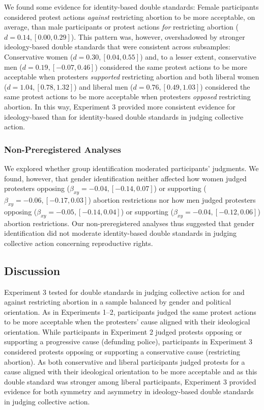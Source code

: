 \documentclass[twocolumn, 11pt, letterpaper]{article}
\begin{document}
We found some evidence for identity-based double standards: Female
participants considered protest actions \emph{against} restricting
abortion to be more acceptable, on average, than male participants or
protest actions \emph{for} restricting abortion
(\(d = 0.14, [0.00, 0.29]\)). This pattern was, however, overshadowed by
stronger ideology-based double standards that were consistent across
subsamples: Conservative women (\(d = 0.30, [0.04, 0.55]\)) and, to a
lesser extent, conservative men (\(d = 0.19, [-0.07, 0.46]\)) considered
the same protest actions to be more acceptable when protesters
\emph{supported} restricting abortion and both liberal women
(\(d = 1.04, [0.78, 1.32]\)) and liberal men
(\(d = 0.76, [0.49, 1.03]\)) considered the same protest actions to be
more acceptable when protesters \emph{opposed} restricting abortion. In
this way, Experiment 3 provided more consistent evidence for
ideology-based than for identity-based double standards in judging
collective action.

\hypertarget{non-preregistered-analyses-2}{%
\subsubsection{Non-Preregistered
Analyses}\label{non-preregistered-analyses-2}}

We explored whether group identification moderated participants'
judgments. We found, however, that gender identification neither
affected how women judged protesters opposing
(\(\beta_{xy} = -0.04, [-0.14, 0.07]\)) or supporting
(\(\beta_{xy} = -0.06, [-0.17, 0.03]\)) abortion restrictions nor how
men judged protesters opposing (\(\beta_{xy} = -0.05, [-0.14, 0.04]\))
or supporting (\(\beta_{xy} = -0.04, [-0.12, 0.06]\)) abortion
restrictions. Our non-preregistered analyses thus suggested that gender
identification did not moderate identity-based double standards in
judging collective action concerning reproductive rights.

\hypertarget{discussion-2}{%
\subsection{Discussion}\label{discussion-2}}

Experiment 3 tested for double standards in judging collective action
for and against restricting abortion in a sample balanced by gender and
political orientation. As in Experiments 1--2, participants judged the
same protest actions to be more acceptable when the protesters' cause
aligned with their ideological orientation. While participants in
Experiment 2 judged protests opposing or supporting a progressive cause
(defunding police), participants in Experiment 3 considered protests
opposing or supporting a conservative cause (restricting abortion). As
both conservative and liberal participants judged protests for a cause
aligned with their ideological orientation to be more acceptable and as
this double standard was stronger among liberal participants, Experiment
3 provided evidence for both symmetry and asymmetry in ideology-based
double standards in judging collective action.
\end{document}

